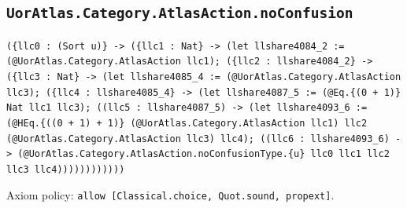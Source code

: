 \documentclass[11pt]{article}
\begin{document}
\subsection*{\texttt{UorAtlas.Category.AtlasAction.noConfusion}}
\noindent\texttt{(\{llc0 : (Sort u)\} -> (\{llc1 : Nat\} -> (let llshare4084\_2 := (@UorAtlas.Category.AtlasAction llc1); (\{llc2 : llshare4084\_2\} -> (\{llc3 : Nat\} -> (let llshare4085\_4 := (@UorAtlas.Category.AtlasAction llc3); (\{llc4 : llshare4085\_4\} -> (let llshare4087\_5 := (@Eq.\{(0 + 1)\} Nat llc1 llc3); ((llc5 : llshare4087\_5) -> (let llshare4093\_6 := (@HEq.\{((0 + 1) + 1)\} (@UorAtlas.Category.AtlasAction llc1) llc2 (@UorAtlas.Category.AtlasAction llc3) llc4); ((llc6 : llshare4093\_6) -> (@UorAtlas.Category.AtlasAction.noConfusionType.\{u\} llc0 llc1 llc2 llc3 llc4))))))))))))}\par
\noindent Axiom policy: \texttt{allow [Classical.choice, Quot.sound, propext]}.\par
\end{document}
